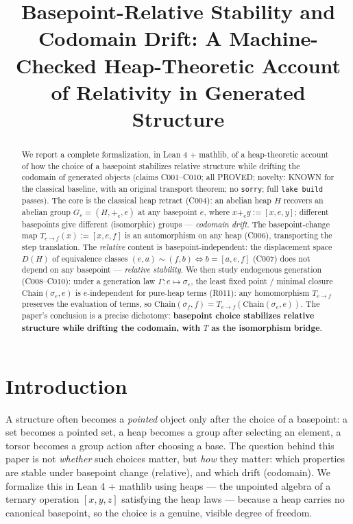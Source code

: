 \documentclass[sigplan,10pt,anonymous,review]{acmart}
\theoremstyle{remark}
\begin{document}
\title{Basepoint-Relative Stability and Codomain Drift: A Machine-Checked Heap-Theoretic Account of Relativity in Generated Structure}

\author{}
\affiliation{%
  \institution{}}
\email{}

\date{}

\begin{abstract}
We report a complete formalization, in Lean 4 + mathlib, of a heap-theoretic account
of how the choice of a basepoint stabilizes relative structure while drifting the
codomain of generated objects (claims C001--C010; all PROVED; novelty: KNOWN for the
classical baseline, with an original transport theorem; no \texttt{sorry}; full
\texttt{lake build} passes). The core is the classical heap retract (C004): an abelian
heap $H$ recovers an abelian group $G_e = (H, +_e, e)$ at any basepoint $e$, where
$x +_e y := [x, e, y]$; different basepoints give different (isomorphic) groups ---
\textit{codomain drift}. The basepoint-change map $T_{e \to f}(x) := [x, e, f]$ is an
automorphism on any heap (C006), transporting the step translation. The \textit{relative}
content is basepoint-independent: the displacement space $D(H)$ of equivalence classes
$(e,a) \sim (f,b) \Longleftrightarrow b = [a, e, f]$ (C007) does not depend on any
basepoint --- \textit{relative stability}. We then study endogenous generation
(C008--C010): under a generation law $\Gamma: e \mapsto \sigma_e$, the least fixed
point / minimal closure $\mathrm{Chain}(\sigma_e, e)$ is $e$-independent for pure-heap
terms (R011): any homomorphism $T_{e \to f}$ preserves the evaluation of terms, so
$\mathrm{Chain}(\sigma_f, f) = T_{e \to f}(\mathrm{Chain}(\sigma_e, e))$. The paper's
conclusion is a precise dichotomy: \textbf{basepoint choice stabilizes relative
structure while drifting the codomain, with $T$ as the isomorphism bridge}.
\end{abstract}


\maketitle

\section{Introduction}

A structure often becomes a \textit{pointed} object only after the choice of a
basepoint: a set becomes a pointed set, a heap becomes a group after selecting an
element, a torsor becomes a group action after choosing a base. The question behind
this paper is not \textit{whether} such choices matter, but \textit{how} they matter:
which properties are stable under basepoint change (relative), and which drift
(codomain). We formalize this in Lean 4 + mathlib using heaps --- the unpointed
algebra of a ternary operation $[x, y, z]$ satisfying the heap laws --- because a heap
carries no canonical basepoint, so the choice is a genuine, visible degree of freedom.
\end{document}
